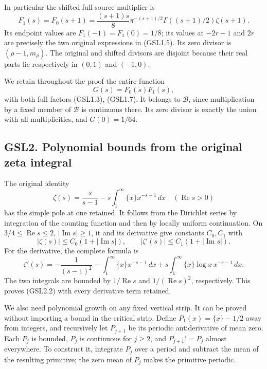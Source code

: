 In particular the shifted full source multiplier is \[
F_1(s)=F_0(s+1)
 =\frac{(s+1)s}{8}\pi^{-(s+1)/2}
       \Gamma((s+1)/2)\zeta(s+1).
\tag{GSL1.7}
\] Its endpoint values are \(F_1(-1)=F_1(0)=1/8\); its values at
\(-2r-1\) and \(2r\) are precisely the two original expressions in
(GSL1.5). Its zero divisor is \((\rho-1,m_\rho)\). The original and
shifted divisors are disjoint because their real parts lie respectively
in \((0,1)\) and \((-1,0)\).

We retain throughout the proof the entire function \[
G(s)=F_0(s)F_1(s),
\tag{GSL1.8}
\] with both full factors (GSL1.3), (GSL1.7). It belongs to
\(\mathcal B\), since multiplication by a fixed member of \(\mathcal B\)
is continuous there. Its zero divisor is exactly the union with all
multiplicities, and \(G(0)=1/64\).

\subsection{GSL2. Polynomial bounds from the original zeta
integral}\label{gsl2.-polynomial-bounds-from-the-original-zeta-integral}

The original identity \[
\zeta(s)=\frac{s}{s-1}-s\int_1^\infty\{x\}x^{-s-1}\,dx
\quad(\operatorname{Re}s>0)
\tag{GSL2.1}
\] has the simple pole at one retained. It follows from the Dirichlet
series by integration of the counting function and then by locally
uniform continuation. On \(3/4\le\operatorname{Re}s\le2\),
\(|\operatorname{Im}s|\ge1\), it and its derivative give constants
\(C_0,C_1\) with \[
|\zeta(s)|\le C_0(1+|\operatorname{Im}s|),\qquad
|\zeta'(s)|\le C_1(1+|\operatorname{Im}s|).
\tag{GSL2.2}
\] For the derivative, the complete formula is \[
\zeta'(s)=-\frac1{(s-1)^2}
 -\int_1^\infty\{x\}x^{-s-1}\,dx
 +s\int_1^\infty\{x\}\log x\,x^{-s-1}\,dx.
\tag{GSL2.3}
\] The two integrals are bounded by \(1/\operatorname{Re}s\) and
\(1/(\operatorname{Re}s)^2\), respectively. This proves (GSL2.2) with
every derivative term retained.

We also need polynomial growth on any fixed vertical strip. It can be
proved without importing a bound in the critical strip. Define
\(P_1(x)=\{x\}-1/2\) away from integers, and recursively let \(P_{j+1}\)
be its periodic antiderivative of mean zero. Each \(P_j\) is bounded,
\(P_j\) is continuous for \(j\ge2\), and \(P_{j+1}'=P_j\) almost
everywhere. To construct it, integrate \(P_j\) over a period and
subtract the mean of the resulting primitive; the zero mean of \(P_j\)
makes the primitive periodic.

